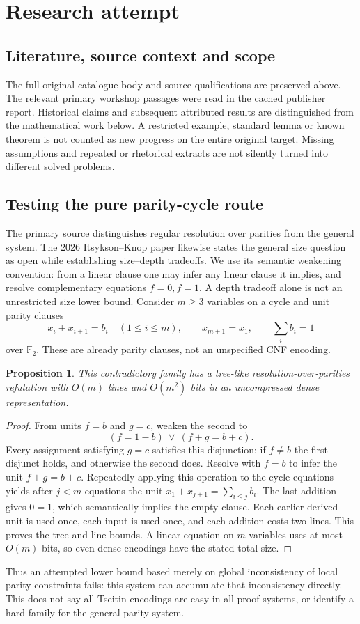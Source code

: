 \documentclass[11pt]{article}
\newtheorem{proposition}{Proposition}
\begin{document}
\section{Research attempt}
\subsection{Literature, source context and scope}
The full original catalogue body and source qualifications are preserved above. The relevant primary workshop passages were read in the cached publisher report. Historical claims and subsequent attributed results are distinguished from the mathematical work below. A restricted example, standard lemma or known theorem is not counted as new progress on the entire original target. Missing assumptions and repeated or rhetorical extracts are not silently turned into different solved problems.

\subsection{Testing the pure parity-cycle route}
The primary source distinguishes regular resolution over parities from the general system. The 2026 Itsykson--Knop paper likewise states the general size question as open while establishing size--depth tradeoffs. We use its semantic weakening convention: from a linear clause one may infer any linear clause it implies, and resolve complementary equations $f=0,f=1$. A depth tradeoff alone is not an unrestricted size lower bound.
Consider $m\ge3$ variables on a cycle and unit parity clauses
\[
x_i+x_{i+1}=b_i\quad(1\le i\le m),\qquad x_{m+1}=x_1,
\qquad \sum_i b_i=1
\]
over $\mathbb F_2$. These are already parity clauses, not an unspecified CNF encoding.
\begin{proposition}
This contradictory family has a tree-like resolution-over-parities refutation with $O(m)$ lines and $O(m^2)$ bits in an uncompressed dense representation.
\end{proposition}
\begin{proof}
From units $f=b$ and $g=c$, weaken the second to
\[
(f=1-b)\ \vee\ (f+g=b+c).
\]
Every assignment satisfying $g=c$ satisfies this disjunction: if $f\ne b$ the first disjunct holds, and otherwise the second does. Resolve with $f=b$ to infer the unit $f+g=b+c$. Repeatedly applying this operation to the cycle equations yields after $j<m$ equations the unit $x_1+x_{j+1}=\sum_{i\le j}b_i$. The last addition gives $0=1$, which semantically implies the empty clause. Each earlier derived unit is used once, each input is used once, and each addition costs two lines. This proves the tree and line bounds. A linear equation on $m$ variables uses at most $O(m)$ bits, so even dense encodings have the stated total size.
\end{proof}
Thus an attempted lower bound based merely on global inconsistency of local parity constraints fails: this system can accumulate that inconsistency directly. This does not say all Tseitin encodings are easy in all proof systems, or identify a hard family for the general parity system.
\end{document}
